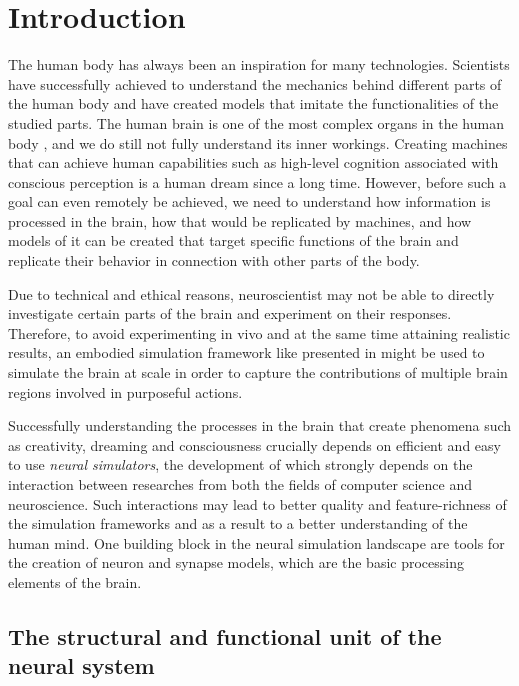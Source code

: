 \chapter{Introduction}
\label{chap:intro}

The human body has always been an inspiration for many technologies. Scientists have successfully achieved to understand the mechanics behind different parts of the human body and have created models that imitate the functionalities of the studied parts. The human brain is one of the most complex organs in the human body \citep{nolte2002human}, and we do still not fully understand its inner workings. Creating machines that can achieve human capabilities such as high-level cognition associated with conscious perception is a human dream since a long time. However, before such a goal can even remotely be achieved, we need to understand how information is processed in the brain, how that would be replicated by machines, and how models of it can be created that target specific functions of the brain and replicate their behavior in connection with other parts of the body.

Due to technical and ethical reasons, neuroscientist may not be able to directly investigate certain parts of the brain and experiment on their responses. Therefore, to avoid experimenting in vivo and at the same time attaining realistic results, an embodied simulation framework like presented in \citet{10.3389/fninf.2022.884180} might be used to simulate the brain at scale in order to capture the contributions of multiple brain regions involved in purposeful actions.

Successfully understanding the processes in the brain that create phenomena such as creativity, dreaming and consciousness crucially depends on efficient and easy to use \emph{neural simulators}, the development of which strongly depends on the interaction between researches from both the fields of computer science and neuroscience. Such interactions may lead to better quality and feature-richness of the simulation frameworks and as a result to a better understanding of the human mind. One building block in the neural simulation landscape are tools for the creation of neuron and synapse models, which are the basic processing elements of the brain. 


\section{The structural and functional unit of the neural system}

